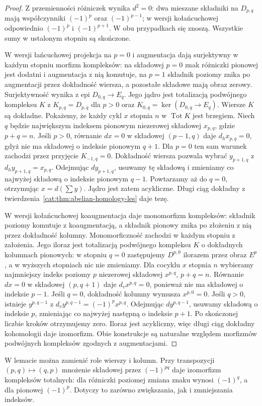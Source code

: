 \begin{proof}
Z przemienności różniczek wynika $d^2=0$: dwa mieszane składniki na $D_{p,q}$ mają współczynniki $(-1)^p$ oraz $(-1)^{p-1}$; w wersji kołańcuchowej odpowiednio $(-1)^p$ i $(-1)^{p+1}$. W obu przypadkach się znoszą. Wszystkie sumy w ustalonym stopniu są skończone.

W wersji łańcuchowej projekcja na $p=0$ i augmentacja dają surjektywny w każdym stopniu morfizm kompleksów: na składowej $p=0$ znak różniczki pionowej jest dodatni i augmentacja z nią komutuje, na $p=1$ składnik poziomy znika po augmentacji przez dokładność wiersza, a pozostałe składowe mają obraz zerowy. Surjektywność wynika z epi $D_{0,q}\to E_q$. Jego jądro jest totalizacją podwójnego kompleksu $K$ z $K_{p,q}=D_{p,q}$ dla $p>0$ oraz $K_{0,q}=\ker(D_{0,q}\to E_q)$. Wiersze $K$ są dokładne. Pokażemy, że każdy cykl $x$ stopnia $n$ w $\operatorname{Tot}K$ jest brzegiem. Niech $q$ będzie największym indeksem pionowym niezerowej składowej $x_{p,q}$, gdzie $p+q=n$. Jeśli $p>0$, równanie $dx=0$ w składowej $(p-1,q)$ daje $d_hx_{p,q}=0$, gdyż nie ma składowej o indeksie pionowym $q+1$. Dla $p=0$ ten sam warunek zachodzi przez przyjęcie $K_{-1,q}=0$. Dokładność wiersza pozwala wybrać $y_{p+1,q}$ z $d_hy_{p+1,q}=x_{p,q}$. Odejmując $dy_{p+1,q}$, usuwamy tę składową i zmieniamy co najwyżej składową o indeksie pionowym $q-1$. Powtarzamy aż do $q=0$, otrzymując $x=d(\sum y)$. Jądro jest zatem acykliczne. Długi ciąg dokładny z twierdzenia~\ref{cat:thm:abelian-homology-les} daje tezę.

W wersji kołańcuchowej koaugmentacja daje monomorfizm kompleksów: składnik poziomy komutuje z koaugmentacją, a składnik pionowy znika po złożeniu z nią przez dokładność kolumny. Monomorficzność zachodzi w każdym stopniu z założenia. Jego iloraz jest totalizacją podwójnego kompleksu $K$ o dokładnych kolumnach pionowych: w stopniu $q=0$ zastępujemy $D^{p,0}$ ilorazem przez obraz $E^p$, a w wyższych stopniach nic nie zmieniamy. Dla cocyklu $x$ stopnia $n$ wybieramy najmniejszy indeks poziomy $p$ niezerowej składowej $x^{p,q}$, $p+q=n$. Równanie $dx=0$ w składowej $(p,q+1)$ daje $d_vx^{p,q}=0$, ponieważ nie ma składowej o indeksie $p-1$. Jeśli $q=0$, dokładność kolumny wymusza $x^{p,0}=0$. Jeśli $q>0$, istnieje $y^{p,q-1}$ z $d_vy^{p,q-1}=(-1)^p x^{p,q}$. Odejmując $dy^{p,q-1}$, usuwamy składową o indeksie $p$, zmieniając co najwyżej następną o indeksie $p+1$. Po skończonej liczbie kroków otrzymujemy zero. Iloraz jest acykliczny, więc długi ciąg dokładny kohomologii daje izomorfizm. Obie konstrukcje są naturalne względem morfizmów podwójnych kompleksów zgodnych z augmentacjami.
\end{proof}
\begin{uwaga}
W lemacie można zamienić role wierszy i kolumn. Przy transpozycji $(p,q)\mapsto(q,p)$ mnożenie składowej przez $(-1)^{pq}$ daje izomorfizm kompleksów totalnych: dla różniczki poziomej zmiana znaku wynosi $(-1)^q$, a dla pionowej $(-1)^p$. Dotyczy to zarówno zwiększania, jak i zmniejszania indeksów.
\end{uwaga}

